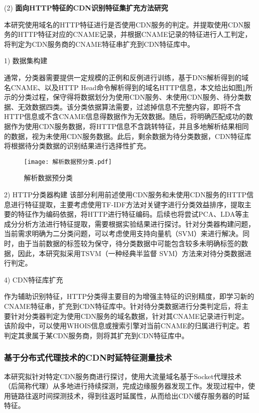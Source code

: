 (2) \textbf{面向HTTP特征的CDN识别特征集扩充方法研究}

本研究使用域名的HTTP特征进行是否使用CDN服务的判定。并提取使用CDN服务的HTTP特征对应的CNAME记录，并根据CNAME记录的特征进行人工判定，将判定为CDN服务商的CNAME特征串扩充到CDN特征库中。

1) 数据集构建

通常，分类器需要提供一定规模的正例和反例进行训练，基于DNS解析得到的域名CNAME、以及HTTP Head命令解析得到的域名HTTP信息，本文给出如图\ref{fig:解析数据预分类}所示的分类过程，保守得将数据划分为使用CDN服务、未使用CDN服务、待分类数据、无效数据四类。该分类依据算法需要，过滤掉信息不完整内容，即将不含HTTP信息或不含CNAME信息得数据作为无效数据。随后，将明确匹配成功的数据作为使用CDN服务数据，将HTTP信息不含跳转特征，并且多地解析结果相同的数据，视为未使用CDN服务数据。此后，剩余数据为待分类数据，CDN特征库将根据待分类数据的识别结果进行选择性扩充。
 
\begin{figure}[ht]
	\centering
	\texttt{[image: 解析数据预分类.pdf]}
	\caption{解析数据预分类}
	\label{fig:解析数据预分类}
\end{figure}
\FloatBarrier

2) HTTP分类器构建
该部分利用前述使用CDN服务和未使用CDN服务的HTTP信息进行特征提取，主要考虑使用TF-IDF方法对关键字进行分类效益排序，提取主要的特征作为编码依据，将HTTP进行特征编码。后续也将尝试PCA、LDA等主成分分析方法进行特征提取，需要根据实验结果进行探讨。针对分类器构建问题，当前需求明确为二分类问题，可以考虑使用支持向量机（SVM）来进行解决。同时，由于当前数据的标签较为保守，待分类数据中可能包含较多未明确标签的数据，因此，本研究拟采用TSVM\cite{Joachims1999}（一种经典半监督 SVM）方法来对待分类数据进行判定。


4) CDN特征库扩充

作为辅助识别特征，HTTP分类得主要目的为增强主特征的识别精度，即学习新的CNAME特征串，扩充到CDN特征库中。针对待分类数据进行分类判定后，将主要针对分类器判定为使用CDN服务的域名数据，针对其CNAME记录进行判定。该阶段中，可以使用WHOIS信息或搜索引擎对当前CNAME的归属进行判定。若判定其隶属于某CDN服务商，则将其扩充到CDN特征库中。
 
\subsubsection{基于分布式代理技术的CDN时延特征测量技术}
本研究拟针对特定CDN服务商进行探讨，使用大流量域名基于Socket代理技术（后简称代理）从多地进行持续探测，完成边缘服务器发现工作。发现过程中，使用链路往返时间探测技术，得到往返时延属性，从而给出CDN缓存服务器的时延特征。

